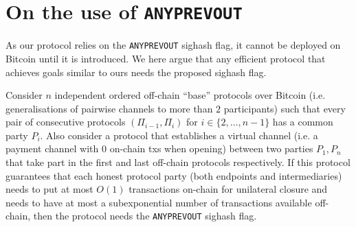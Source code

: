 \section{On the use of \texttt{ANYPREVOUT}}
  \label{section:anyprevout}
  As our protocol relies on the \texttt{ANYPREVOUT} sighash flag, it cannot be
  deployed on Bitcoin until it is introduced. We here argue that any efficient
  protocol that achieves goals similar to ours needs the proposed sighash flag.

  \begin{theorem}
    \label{theorem:anyprevout}
    Consider $n$ independent ordered off-chain ``base'' protocols over Bitcoin
    (i.e. generalisations of pairwise channels to more than $2$ participants)
    such that every pair of consecutive protocols $(\Pi_{i-1}, \Pi_i)$ for $i
    \in \{2, \dots, n-1\}$ has a common party $P_i$. Also consider a protocol
    that establishes a virtual channel (i.e. a payment channel with $0$ on-chain
    txs when opening) between two parties $P_1, P_n$ that take part in the first
    and last off-chain protocols respectively. If this protocol guarantees that
    each honest protocol party (both endpoints and intermediaries) needs to put
    at most $O(1)$ transactions on-chain for unilateral closure and needs to
    have at most a subexponential number of transactions available off-chain,
    then the protocol needs the \texttt{ANYPREVOUT} sighash flag.
  \end{theorem}

